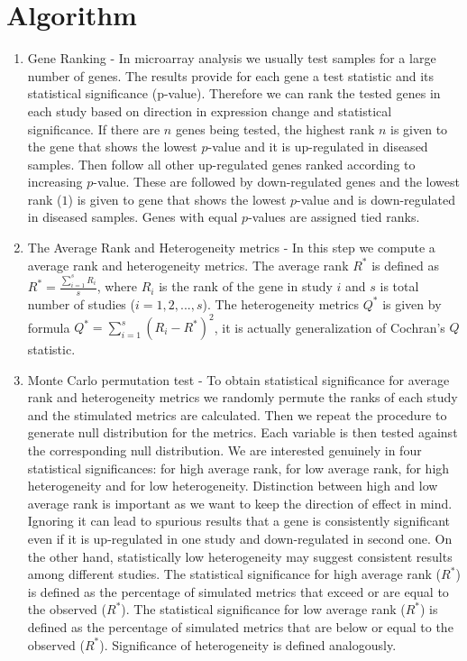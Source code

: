 \documentclass[a4paper]{report}
\begin{document}
\section*{Algorithm}
\begin{enumerate}
\item Gene Ranking - In microarray analysis we usually test samples for a large number of genes. The results provide for each gene a test statistic and its statistical significance (p-value). Therefore we can rank the tested genes in each study based on direction in expression change and statistical significance. If there are $n$ genes being tested, the highest rank $n$ is given to the gene that shows the lowest $p$-value and it is up-regulated in diseased samples. Then follow all other up-regulated genes ranked according to increasing $p$-value. These are followed by down-regulated genes and the lowest rank ($1$) is given to gene that shows the lowest $p$-value and is down-regulated in diseased samples. Genes with equal $p$-values are assigned tied ranks. 
\item The Average Rank and Heterogeneity metrics - In this step we compute a average rank and heterogeneity metrics. The average rank $R^*$ is defined as $R^*= \frac{\sum_{i=1}^{s}R_i}{s}$, where $R_i$ is the rank of the gene in study $i$ and $s$ is total number of studies ($i=1,2,...,s$). The heterogeneity metrics $Q^*$ is given by formula $Q^*=\sum_{i=1}^{s}(R_i-R^*)^2$, it is actually generalization of Cochran's $Q$ statistic. 
\item Monte Carlo permutation test - To obtain statistical significance for average rank and heterogeneity metrics we randomly permute the ranks of each study and the stimulated metrics are calculated. Then we repeat the procedure to generate null distribution for the metrics. Each variable is then tested against the corresponding null distribution. We are interested genuinely in four statistical significances: for high average rank, for low average rank, for high heterogeneity and for low heterogeneity. Distinction between high and low average rank is important as we want to keep the direction of effect in mind. Ignoring it can lead to spurious results that a gene is consistently significant even if it is up-regulated in one study and down-regulated in second one. On the other hand, statistically low heterogeneity may suggest consistent results among different studies. The statistical significance for high average rank ($R^*$) is defined as the percentage of simulated metrics that exceed or are equal to the observed ($R^*$). The statistical significance for low average rank ($R^*$) is defined as the percentage of simulated metrics that are below or equal to the observed ($R^*$). Significance of heterogeneity is defined analogously.  
\end{enumerate}
\end{document}
